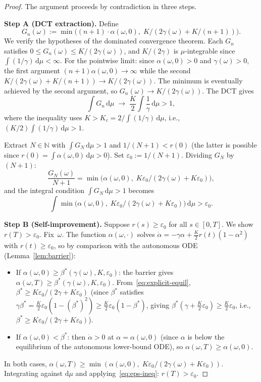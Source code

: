 \documentclass[11pt,a4paper]{article}
\theoremstyle{definition}
\newcommand{\N}{\mathbb{N}}
\begin{document}
\begin{proof}
The argument proceeds by contradiction in three steps.

\textbf{Step A (DCT extraction).}
Define
\[
G_n(\omega):=\min\!\bigl((n{+}1)\cdot\alpha(\omega,0),\; K/(2\gamma(\omega)+K/(n{+}1))\bigr).
\]
We verify the hypotheses of the dominated convergence theorem. Each $G_n$ satisfies $0\leq G_n(\omega)\leq K/(2\gamma(\omega))$, and $K/(2\gamma)$ is $\mu$-integrable since $\int(1/\gamma)\,\mathrm{d}\mu<\infty$. For the pointwise limit: since $\alpha(\omega,0)>0$ and $\gamma(\omega)>0$, the first argument $(n+1)\alpha(\omega,0)\to\infty$ while the second $K/(2\gamma(\omega)+K/(n+1))\to K/(2\gamma(\omega))$. The minimum is eventually achieved by the second argument, so $G_n(\omega)\to K/(2\gamma(\omega))$. The DCT gives
\[
\int G_n\,\mathrm{d}\mu \;\longrightarrow\; \frac{K}{2}\int\frac{1}{\gamma}\,\mathrm{d}\mu > 1,
\]
where the inequality uses $K>K_c = 2/\!\int\!(1/\gamma)\,\mathrm{d}\mu$, i.e., $(K/2)\int(1/\gamma)\,\mathrm{d}\mu>1$.

Extract $N\in\N$ with $\int G_N\,\mathrm{d}\mu>1$ and $1/(N{+}1)<r(0)$ (the latter is possible since $r(0)=\int\alpha(\omega,0)\,\mathrm{d}\mu>0$). Set $\varepsilon_0:=1/(N{+}1)$. Dividing $G_N$ by $(N{+}1)$:
\[
\frac{G_N(\omega)}{N{+}1} = \min\!\bigl(\alpha(\omega,0),\; K\varepsilon_0/(2\gamma(\omega)+K\varepsilon_0)\bigr),
\]
and the integral condition $\int G_N\,\mathrm{d}\mu > 1$ becomes
\begin{equation}\label{eq:eps-ineq}
\int\min\!\bigl(\alpha(\omega,0),\; K\varepsilon_0/(2\gamma(\omega)+K\varepsilon_0)\bigr)\,\mathrm{d}\mu > \varepsilon_0.
\end{equation}

\textbf{Step B (Self-improvement).}
Suppose $r(s)\geq\varepsilon_0$ for all $s\in[0,T]$. We show $r(T)>\varepsilon_0$. Fix~$\omega$. The function $\alpha(\omega,\cdot)$ solves $\dot\alpha=-\gamma\alpha+\tfrac{K}{2}r(t)(1-\alpha^2)$ with $r(t)\geq\varepsilon_0$, so by comparison with the autonomous ODE (Lemma~\ref{lem:barrier}):
\begin{itemize}
\item If $\alpha(\omega,0)\geq\beta^*(\gamma(\omega),K,\varepsilon_0)$: the barrier gives $\alpha(\omega,T)\geq\beta^*(\gamma(\omega),K,\varepsilon_0)$. From~\eqref{eq:explicit-equil}, $\beta^*\geq K\varepsilon_0/(2\gamma+K\varepsilon_0)$ (since $\beta^*$ satisfies $\gamma\beta^*=\tfrac{K}{2}\varepsilon_0(1-(\beta^*)^2)\geq\tfrac{K}{2}\varepsilon_0(1-\beta^*)$, giving $\beta^*(\gamma+\tfrac{K}{2}\varepsilon_0)\geq\tfrac{K}{2}\varepsilon_0$, i.e., $\beta^*\geq K\varepsilon_0/(2\gamma+K\varepsilon_0)$).
\item If $\alpha(\omega,0)<\beta^*$: then $\dot\alpha>0$ at $\alpha=\alpha(\omega,0)$ (since $\alpha$ is below the equilibrium of the autonomous lower-bound ODE), so $\alpha(\omega,T)\geq\alpha(\omega,0)$.
\end{itemize}
In both cases, $\alpha(\omega,T)\geq\min(\alpha(\omega,0),\;K\varepsilon_0/(2\gamma(\omega)+K\varepsilon_0))$. Integrating against $\mathrm{d}\mu$ and applying~\eqref{eq:eps-ineq}: $r(T)>\varepsilon_0$.


\end{proof}
\end{document}
